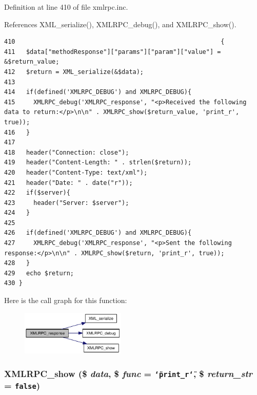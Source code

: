 Definition at line 410 of file xmlrpc.inc.

References XML\_\-serialize(), XMLRPC\_\-debug(), and XMLRPC\_\-show().

\begin{Code}\begin{verbatim}410                                                        {
411   $data["methodResponse"]["params"]["param"]["value"] = &$return_value;
412   $return = XML_serialize(&$data);
413 
414   if(defined('XMLRPC_DEBUG') and XMLRPC_DEBUG){
415     XMLRPC_debug('XMLRPC_response', "<p>Received the following data to return:</p>\n\n" . XMLRPC_show($return_value, 'print_r', true));
416   }
417 
418   header("Connection: close");
419   header("Content-Length: " . strlen($return));
420   header("Content-Type: text/xml");
421   header("Date: " . date("r"));
422   if($server){
423     header("Server: $server");
424   }
425 
426   if(defined('XMLRPC_DEBUG') and XMLRPC_DEBUG){
427     XMLRPC_debug('XMLRPC_response', "<p>Sent the following response:</p>\n\n" . XMLRPC_show($return, 'print_r', true));
428   }
429   echo $return;
430 }
\end{verbatim}
\end{Code}




Here is the call graph for this function:\nopagebreak
\begin{figure}[H]
\begin{center}
\leavevmode
\includegraphics[width=141pt]{xmlrpc_8inc_c736d378caaccdd0726ea1080d1f526f_cgraph}
\end{center}
\end{figure}
\hypertarget{xmlrpc_8inc_1f60d2672bcb35f5ff908f64931f8d48}{
\subsubsection{\setlength{\rightskip}{0pt plus 5cm}XMLRPC\_\-show (\$ {\em data}, \$ {\em func} = {\tt \char`\"{}print\_\-r\char`\"{}}, \$ {\em return\_\-str} = {\tt false})}}
\label{xmlrpc_8inc_1f60d2672bcb35f5ff908f64931f8d48}





